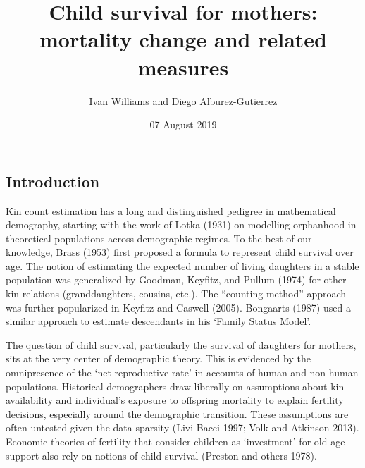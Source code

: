 \documentclass[
]{article}
\title{Child survival for mothers: mortality change and related
measures}
\author{Ivan Williams and Diego Alburez-Gutierrez}
\date{07 August 2019}
\begin{document}
\maketitle

\hypertarget{introduction}{%
\subsection{Introduction}\label{introduction}}

Kin count estimation has a long and distinguished pedigree in
mathematical demography, starting with the work of Lotka (1931) on
modelling orphanhood in theoretical populations across demographic
regimes. To the best of our knowledge, Brass (1953) first proposed a
formula to represent child survival over age. The notion of estimating
the expected number of living daughters in a stable population was
generalized by Goodman, Keyfitz, and Pullum (1974) for other kin
relations (granddaughters, cousins, etc.). The ``counting method''
approach was further popularized in Keyfitz and Caswell (2005).
Bongaarts (1987) used a similar approach to estimate descendants in his
`Family Status Model'.

The question of child survival, particularly the survival of daughters
for mothers, sits at the very center of demographic theory. This is
evidenced by the omnipresence of the `net reproductive rate' in accounts
of human and non-human populations. Historical demographers draw
liberally on assumptions about kin availability and individual's
exposure to offspring mortality to explain fertility decisions,
especially around the demographic transition. These assumptions are
often untested given the data sparsity (Livi Bacci 1997; Volk and
Atkinson 2013). Economic theories of fertility that consider children as
`investment' for old-age support also rely on notions of child survival
(Preston and others 1978).
\end{document}
